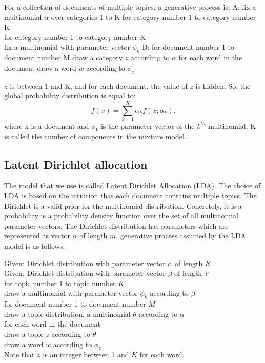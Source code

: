 \documentclass[twoside,12pt]{article}
\begin{document}
For a collection of documents of multiple topics, a generative process is:
A: fix a multinomial $\alpha$ over categories 1 to K for category number 1 to category number K \\
for category number 1 to category number K \\
fix a multinomial with parameter vector $\phi_k$
B: for document number 1 to document number M
draw a category $z$ according to $\alpha$
for each word in the document
draw a word $w$ according to $\phi_z$

$z$ is between 1 and K, and for each document, the value of $z$ is hidden. So, the global probability distribution is equal to:
\begin{equation}
f(x)=\sum_{k=1}^K \alpha_k f(x;\alpha_k).
\end{equation}
where x is a document and $\phi_k$ is the parameter vector of the $k^{th}$ multinomial. K is called the number of components in the mixture model. 

\subsection{Latent Dirichlet allocation}
The model that we use is called Latent Dirichlet Allocation (LDA). The choice of LDA is based on the intuition that each document contains multiple topics. The Dirichlet is a valid prior for the multinomial distribution. Concretely, it is a probability is a probability density function over the set of all multinomial parameter vectors. The Dirichlet distribution has parameters which are represented as vector $\alpha$ of length $m$. generative process assumed by the LDA model is as follows:

Given: Dirichlet distribution with parameter vector $\alpha$ of length $K$ \\ 
Given: Dirichlet distribution with parameter vector $\beta$ of length $V$ \\
for topic number 1 to topic number $K$ \\ 
draw a multinomial with parameter vector $\phi_k$ according to $\beta$ \\
for document number 1 to document number $M$\\
draw a topic distribution, a multinomial $\theta$ according to $\alpha$ \\
for each word in the document \\
draw a topic $z$ according to $\theta$ \\
draw a word $w$ according to $\phi_z$ \\
Note that $z$ is an integer between 1 and $K$ for each word. 
\end{document}
